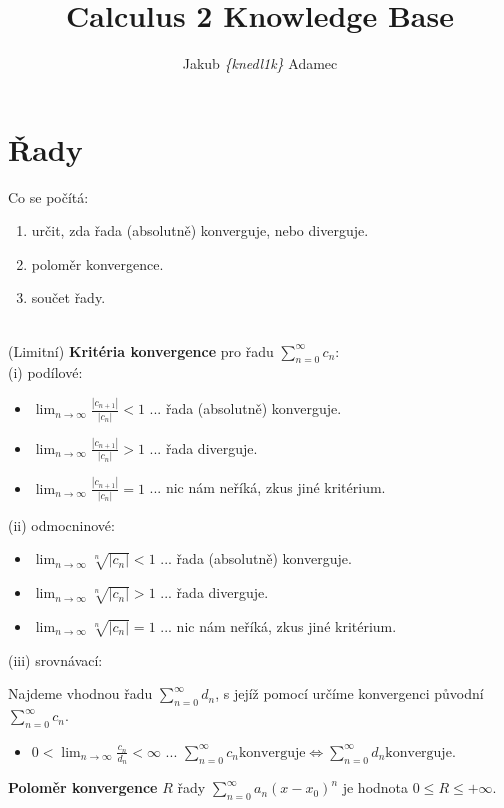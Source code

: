 \documentclass{article}
\title{Calculus 2 Knowledge Base}
\author{Jakub \textit{\{knedl1k\}} Adamec}
\begin{document}
\maketitle
\newpage
{}

\section{Řady}

Co se počítá: 
\begin{enumerate}
    \item určit, zda řada (absolutně) konverguje, nebo diverguje.
    \item poloměr konvergence.
    \item součet řady.
\end{enumerate}
\\
(Limitní) \textbf{Kritéria konvergence} pro řadu $\sum_{n=0}^{\infty} c_n$:
\\
(i) podílové:

    \begin{itemize}
        \item $\lim_{n \to \infty} \frac{|c_{n +1}|}{|c_n|} < 1$ ... řada (absolutně) konverguje.
        \item $\lim_{n \to \infty} \frac{|c_{n +1}|}{|c_n|} > 1$ ... řada diverguje.
        \item $\lim_{n \to \infty} \frac{|c_{n +1}|}{|c_n|} = 1$ ... nic nám neříká, zkus jiné kritérium.
    \end{itemize}
(ii) odmocninové:

    \begin{itemize}
        \item $\lim_{n \to \infty} \sqrt[n]{|c_n|} < 1$ ... řada (absolutně) konverguje.
        \item $\lim_{n \to \infty} \sqrt[n]{|c_n|} > 1$ ... řada diverguje.
        \item $\lim_{n \to \infty} \sqrt[n]{|c_n|} = 1$ ... nic nám neříká, zkus jiné kritérium.
    \end{itemize}
(iii) srovnávací:

Najdeme vhodnou řadu $\sum_{n=0}^{\infty} d_n$, s jejíž pomocí určíme konvergenci původní $\sum_{n=0}^{\infty} c_n$.
    \begin{itemize}
        \item $0 < \lim_{n \to \infty} \frac{c_n}{d_n} < \infty$ ... $\sum_{n=0}^{\infty} c_n \text{konverguje} \iff \sum_{n=0}^{\infty} d_n \text{konverguje}$.
    \end{itemize}
\textbf{Poloměr konvergence} $R$ řady $\sum_{n=0}^{\infty} a_n (x-x_0)^n$ je hodnota $0 \leq R \leq +\infty$. 
\end{document}
